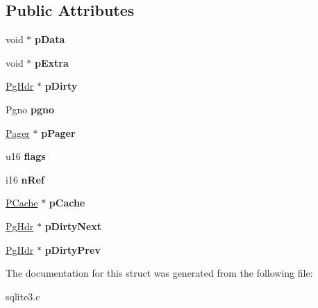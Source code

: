 \subsection*{Public Attributes}
\begin{DoxyCompactItemize}
\item 
\hypertarget{struct_pg_hdr_a0f9f2ac8492c0cdad5898036db20b798}{void $\ast$ {\bfseries p\-Data}}\label{struct_pg_hdr_a0f9f2ac8492c0cdad5898036db20b798}

\item 
\hypertarget{struct_pg_hdr_a8ff7430ed04077f1ae20d10801968164}{void $\ast$ {\bfseries p\-Extra}}\label{struct_pg_hdr_a8ff7430ed04077f1ae20d10801968164}

\item 
\hypertarget{struct_pg_hdr_a7732b1c0f19d9555ac93d4879fc95bbd}{\hyperlink{struct_pg_hdr}{Pg\-Hdr} $\ast$ {\bfseries p\-Dirty}}\label{struct_pg_hdr_a7732b1c0f19d9555ac93d4879fc95bbd}

\item 
\hypertarget{struct_pg_hdr_ab6e2223e410acf9bae7f12f1b1293589}{Pgno {\bfseries pgno}}\label{struct_pg_hdr_ab6e2223e410acf9bae7f12f1b1293589}

\item 
\hypertarget{struct_pg_hdr_aaa4879a9510c8a819a1e10a8ee21495b}{\hyperlink{struct_pager}{Pager} $\ast$ {\bfseries p\-Pager}}\label{struct_pg_hdr_aaa4879a9510c8a819a1e10a8ee21495b}

\item 
\hypertarget{struct_pg_hdr_a8ef58380f7e04f1e3c76fa208e227f95}{u16 {\bfseries flags}}\label{struct_pg_hdr_a8ef58380f7e04f1e3c76fa208e227f95}

\item 
\hypertarget{struct_pg_hdr_ac68c685d117788c18849e8853dd419d5}{i16 {\bfseries n\-Ref}}\label{struct_pg_hdr_ac68c685d117788c18849e8853dd419d5}

\item 
\hypertarget{struct_pg_hdr_a557aeaddd1b0805815ce06f1bfd27782}{\hyperlink{struct_p_cache}{P\-Cache} $\ast$ {\bfseries p\-Cache}}\label{struct_pg_hdr_a557aeaddd1b0805815ce06f1bfd27782}

\item 
\hypertarget{struct_pg_hdr_a61b56eb694ce445799963f7eb912e367}{\hyperlink{struct_pg_hdr}{Pg\-Hdr} $\ast$ {\bfseries p\-Dirty\-Next}}\label{struct_pg_hdr_a61b56eb694ce445799963f7eb912e367}

\item 
\hypertarget{struct_pg_hdr_a8392b45bb05d88c734020beb912304dc}{\hyperlink{struct_pg_hdr}{Pg\-Hdr} $\ast$ {\bfseries p\-Dirty\-Prev}}\label{struct_pg_hdr_a8392b45bb05d88c734020beb912304dc}

\end{DoxyCompactItemize}


The documentation for this struct was generated from the following file\-:\begin{DoxyCompactItemize}
\item 
sqlite3.\-c\end{DoxyCompactItemize}
